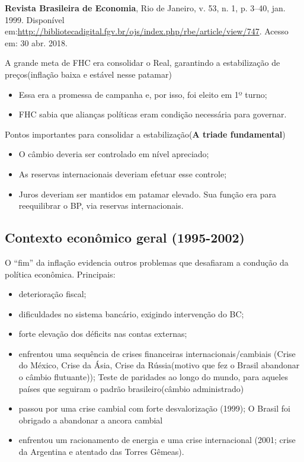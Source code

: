 \documentclass[a4paper,12pt]{article}[abntex2]
\begin{document}
\textbf{Revista Brasileira de Economia}, Rio de Janeiro, v. 53, n. 1, p. 3–40, jan. 1999. Disponível em:\url{http://bibliotecadigital.fgv.br/ojs/index.php/rbe/article/view/747}. Acesso em: 30 abr. 2018.

A grande meta de FHC era consolidar o Real, garantindo a estabilização de preços(inflação baixa e estável nesse patamar)
\begin{itemize}
  \item Essa era a promessa de campanha e, por isso, foi eleito em 1º turno;
  \item FHC sabia que alianças políticas eram condição necessária para governar.
\end{itemize}

Pontos importantes para consolidar a estabilização(\textbf{A triade fundamental})
\begin{itemize}
  \item O câmbio deveria ser controlado em nível apreciado;
  \item As reservas internacionais deveriam efetuar esse controle;
  \item Juros deveriam ser mantidos em patamar elevado. Sua função era para reequilibrar o BP, via reservas internacionais.
\end{itemize}

\subsection{\textbf{Contexto econômico geral (1995-2002)}}
O “fim” da inflação evidencia outros problemas que desafiaram a condução da política econômica. Principais:
\begin{itemize}
  \item deterioração fiscal;
  \item dificuldades no sistema bancário, exigindo intervenção do BC;
  \item forte elevação dos déficits nas contas externas;
  \item enfrentou uma sequência de crises financeiras internacionais/cambiais (Crise do México, Crise da Ásia, Crise da Rússia(motivo que fez o Brasil abandonar o câmbio flutuante)); Teste de paridades ao longo do mundo, para aqueles países que seguiram o padrão brasileiro(câmbio administrado)
  \item passou por uma crise cambial com forte desvalorização (1999); O Brasil foi obrigado a abandonar a ancora cambial
  \item enfrentou um racionamento de energia e uma crise internacional (2001; crise da Argentina e atentado das Torres Gêmeas).
\end{itemize}
\end{document}
